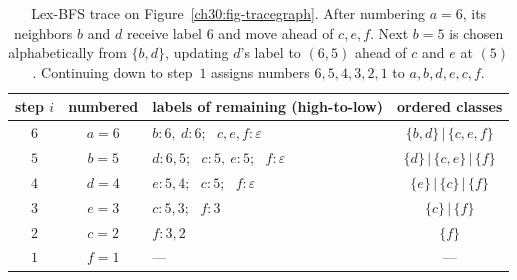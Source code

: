 \begin{table}[htbp]
\centering
\small
\begin{tabular}{c|c|l|c}
\toprule
step $i$ & numbered & labels of remaining (high-to-low) & ordered classes \\
\midrule
$6$ & $a\!=\!6$ & $b{:}6,\ d{:}6$; \ $c,e,f{:}\varepsilon$ & $\{b,d\}\,|\,\{c,e,f\}$ \\
$5$ & $b\!=\!5$ & $d{:}6,5$; \ $c{:}5,\ e{:}5$; \ $f{:}\varepsilon$ & $\{d\}\,|\,\{c,e\}\,|\,\{f\}$ \\
$4$ & $d\!=\!4$ & $e{:}5,4$; \ $c{:}5$; \ $f{:}\varepsilon$ & $\{e\}\,|\,\{c\}\,|\,\{f\}$ \\
$3$ & $e\!=\!3$ & $c{:}5,3$; \ $f{:}3$ & $\{c\}\,|\,\{f\}$ \\
$2$ & $c\!=\!2$ & $f{:}3,2$ & $\{f\}$ \\
$1$ & $f\!=\!1$ & --- & --- \\
\bottomrule
\end{tabular}
\caption{Lex-BFS trace on Figure~\ref{ch30:fig-tracegraph}. After numbering $a=6$, its neighbors $b$ and $d$ receive label $6$ and move ahead of $c,e,f$. Next $b=5$ is chosen alphabetically from $\{b,d\}$, updating $d$'s label to $(6,5)$ ahead of $c$ and $e$ at $(5)$. Continuing down to step~$1$ assigns numbers $6,5,4,3,2,1$ to $a,b,d,e,c,f$.}
\label{ch30:tab-trace}
\end{table}

